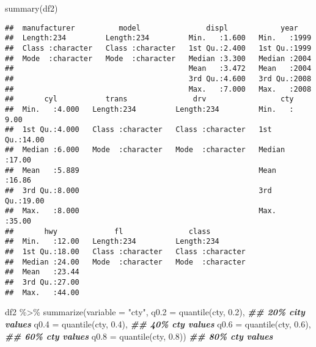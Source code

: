 \documentclass[
]{article}
\newenvironment{Shaded}{\begin{snugshade}}{\end{snugshade}}
\newcommand{\AttributeTok}[1]{\textcolor[rgb]{0.77,0.63,0.00}{#1}}
\newcommand{\DocumentationTok}[1]{\textcolor[rgb]{0.56,0.35,0.01}{\textbf{\textit{#1}}}}
\newcommand{\FloatTok}[1]{\textcolor[rgb]{0.00,0.00,0.81}{#1}}
\newcommand{\FunctionTok}[1]{\textcolor[rgb]{0.00,0.00,0.00}{#1}}
\newcommand{\NormalTok}[1]{#1}
\newcommand{\SpecialCharTok}[1]{\textcolor[rgb]{0.00,0.00,0.00}{#1}}
\newcommand{\StringTok}[1]{\textcolor[rgb]{0.31,0.60,0.02}{#1}}
\begin{document}
\begin{Shaded}
\begin{Highlighting}[]
\FunctionTok{summary}\NormalTok{(df2)}
\end{Highlighting}
\end{Shaded}

\begin{verbatim}
##  manufacturer          model               displ            year     
##  Length:234         Length:234         Min.   :1.600   Min.   :1999  
##  Class :character   Class :character   1st Qu.:2.400   1st Qu.:1999  
##  Mode  :character   Mode  :character   Median :3.300   Median :2004  
##                                        Mean   :3.472   Mean   :2004  
##                                        3rd Qu.:4.600   3rd Qu.:2008  
##                                        Max.   :7.000   Max.   :2008  
##       cyl           trans               drv                 cty       
##  Min.   :4.000   Length:234         Length:234         Min.   : 9.00  
##  1st Qu.:4.000   Class :character   Class :character   1st Qu.:14.00  
##  Median :6.000   Mode  :character   Mode  :character   Median :17.00  
##  Mean   :5.889                                         Mean   :16.86  
##  3rd Qu.:8.000                                         3rd Qu.:19.00  
##  Max.   :8.000                                         Max.   :35.00  
##       hwy             fl               class          
##  Min.   :12.00   Length:234         Length:234        
##  1st Qu.:18.00   Class :character   Class :character  
##  Median :24.00   Mode  :character   Mode  :character  
##  Mean   :23.44                                        
##  3rd Qu.:27.00                                        
##  Max.   :44.00
\end{verbatim}

\begin{Shaded}
\begin{Highlighting}[]
\NormalTok{df2 }\SpecialCharTok{\%\textgreater{}\%}
    \FunctionTok{summarize}\NormalTok{(}\AttributeTok{variable =} \StringTok{"cty"}\NormalTok{,}
              \AttributeTok{q0.2 =} \FunctionTok{quantile}\NormalTok{(cty, }\FloatTok{0.2}\NormalTok{), }\DocumentationTok{\#\# 20\% city values}
              \AttributeTok{q0.4 =} \FunctionTok{quantile}\NormalTok{(cty, }\FloatTok{0.4}\NormalTok{), }\DocumentationTok{\#\# 40\% cty values}
              \AttributeTok{q0.6 =} \FunctionTok{quantile}\NormalTok{(cty, }\FloatTok{0.6}\NormalTok{), }\DocumentationTok{\#\# 60\% cty values}
              \AttributeTok{q0.8 =} \FunctionTok{quantile}\NormalTok{(cty, }\FloatTok{0.8}\NormalTok{)) }\DocumentationTok{\#\# 80\% cty values}
\end{Highlighting}
\end{Shaded}
\end{document}
